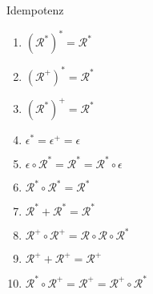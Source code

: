 \documentclass[]{beamer}
\begin{document}
\begin{frame}[squeeze]{}
  \begin{block}{Idempotenz}
    \begin{enumerate}
      \item $\left(\mathcal{R}^*\right)^* = \mathcal{R}^*$
      \pause
      \item $\left(\mathcal{R}^+\right)^* = \mathcal{R}^*$
      \pause
      \item $\left(\mathcal{R}^*\right)^+ = \mathcal{R}^*$
      \pause
      \item $\epsilon^* = \epsilon^+ = \epsilon$
      \pause
      \item $\epsilon \circ \mathcal{R}^* = \mathcal{R}^* = \mathcal{R}^* \circ \epsilon$
      \pause
      \item $\mathcal{R}^* \circ \mathcal{R}^* = \mathcal{R}^*$
      \pause
      \item $\mathcal{R}^* + \mathcal{R}^* = \mathcal{R}^*$
      \pause
      \item $\mathcal{R}^+ \circ \mathcal{R}^+ = \mathcal{R} \circ \mathcal{R} \circ \mathcal{R}^*$
      \pause
      \item $\mathcal{R}^+ + \mathcal{R}^+ = \mathcal{R}^+$
      \pause
      \item $\mathcal{R}^* \circ \mathcal{R}^+ = \mathcal{R}^+ = \mathcal{R}^+ \circ \mathcal{R}^*$
    \end{enumerate}
  \end{block}
\end{frame}
\end{document}
